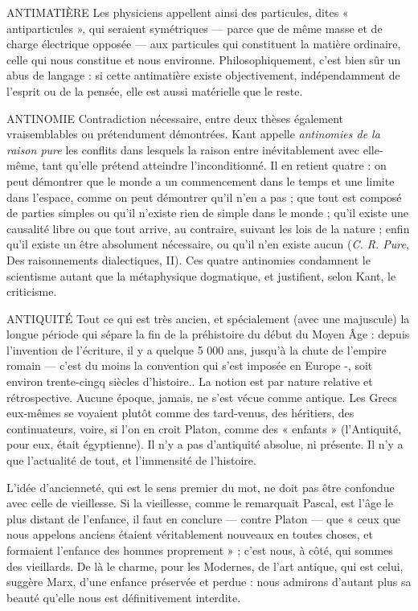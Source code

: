 ANTIMATIÈRE Les physiciens appellent ainsi des particules, dites « antiparticules »,
qui seraient symétriques — parce que de même
masse et de charge électrique opposée — aux particules qui constituent la
matière ordinaire, celle qui nous constitue et nous environne. Philosophiquement,
c’est bien sûr un abus de langage : si cette antimatière existe objectivement,
indépendamment de l'esprit ou de la pensée, elle est aussi matérielle que
le reste.

ANTINOMIE Contradiction nécessaire, entre deux thèses également vraisemblables
ou prétendument démontrées. Kant appelle {\it antinomies
de la raison pure} les conflits dans lesquels la raison entre inévitablement
avec elle-même, tant qu’elle prétend atteindre l’inconditionné. Il en retient
quatre : on peut démontrer que le monde a un commencement dans le temps
et une limite dans l’espace, comme on peut démontrer qu’il n’en a pas ; que
tout est composé de parties simples ou qu’il n’existe rien de simple dans le
monde ; qu’il existe une causalité libre ou que tout arrive, au contraire, suivant
les lois de la nature ; enfin qu’il existe un être absolument nécessaire, ou qu’il
n’en existe aucun ({\it C. R. Pure}, Des raisonnements dialectiques, II). Ces quatre
antinomies condamnent le scientisme autant que la métaphysique dogmatique,
et justifient, selon Kant, le criticisme.

ANTIQUITÉ Tout ce qui est très ancien, et spécialement (avec une majuscule)
la longue période qui sépare la fin de la préhistoire
du début du Moyen Âge : depuis l’invention de l'écriture, il y a quelque
5 000 ans, jusqu’à la chute de l’empire romain — c’est du moins la convention
qui s’est imposée en Europe -, soit environ trente-cingq siècles d’histoire.. La
notion est par nature relative et rétrospective. Aucune époque, jamais, ne s’est
vécue comme antique. Les Grecs eux-mêmes se voyaient plutôt comme des
tard-venus, des héritiers, des continuateurs, voire, si l’on en croit Platon,
comme des « enfants » (l’Antiquité, pour eux, était égyptienne). Il n’y a pas
d’antiquité absolue, ni présente. Il n’y a que l'actualité de tout, et l’immensité
de l’histoire.

L'idée d’ancienneté, qui est le sens premier du mot, ne doit pas être confondue
avec celle de vieillesse. Si la vieillesse, comme le remarquait Pascal,
est l’âge le plus distant de l'enfance, il faut en conclure — contre Platon — que
« ceux que nous appelons anciens étaient véritablement nouveaux en toutes
choses, et formaient l'enfance des hommes proprement » ; c’est nous, à côté,
qui sommes des vieillards. De là le charme, pour les Modernes, de l’art
antique, qui est celui, suggère Marx, d’une enfance préservée et perdue :
nous admirons d’autant plus sa beauté qu’elle nous est définitivement interdite.

